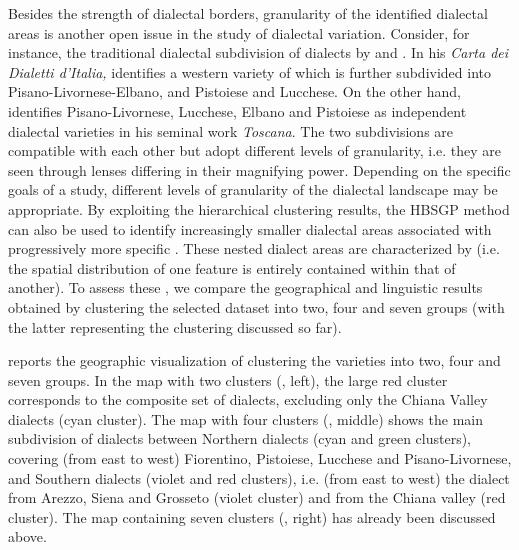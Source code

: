 \documentclass[output=paper]{LSP/langsci}
\begin{document}
Besides the strength of dialectal borders, granularity of the identified dialectal areas is another open issue in the study of dialectal variation. Consider, for instance, the traditional dialectal subdivision of  dialects by \citet{pellegrini_carta_1977} and \citet{giannelli_toscana_1976}. In his \textit{Carta dei Dialetti d’Italia, }\citet{pellegrini_carta_1977} identifies a western variety of  which is further subdivided into Pisano-Livornese-Elbano, and Pistoiese and Lucchese. On the other hand, \citet{giannelli_toscana_1976} identifies Pisano-Livornese, Lucchese, Elbano and Pistoiese as independent dialectal varieties in his seminal work \textit{Toscana}. The two subdivisions are compatible with each other but adopt different levels of granularity, i.e. they are seen through lenses differing in their magnifying power. Depending on the specific goals of a study, different levels of granularity of the dialectal landscape may be appropriate. By exploiting the hierarchical clustering results, the HBSGP method can also be used to identify increasingly smaller dialectal areas associated with progressively more specific . These nested dialect areas are characterized by  (i.e. the spatial distribution of one feature is entirely contained within that of another). To assess these , we compare the geographical and linguistic results obtained by clustering the selected dataset into two, four and seven groups (with the latter representing the clustering discussed so far).
 

 reports the geographic visualization of clustering the  varieties into two, four and seven groups. In the map with two clusters (, left), the large red cluster corresponds to the composite set of  dialects, excluding only the Chiana Valley dialects (cyan cluster). The map with four clusters (, middle) shows the main subdivision of  dialects between Northern dialects (cyan and green clusters), covering (from east to west) Fiorentino, Pistoiese, Lucchese and Pisano-Livornese, and Southern dialects (violet and red clusters), i.e. (from east to west) the dialect from Arezzo, Siena and Grosseto (violet cluster) and from the Chiana valley (red cluster). The map containing seven clusters (, right) has already been discussed above. 
\end{document}
